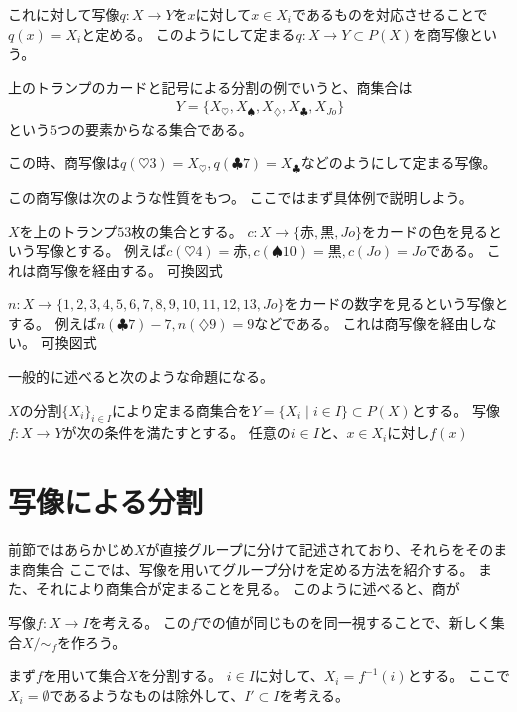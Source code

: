 これに対して写像$q:X\to Y$を$x$に対して$x\in X_i$であるものを対応させることで$q(x)=X_i$と定める。
このようにして定まる$q:X\to Y\subset P(X)$を商写像という。

\begin{eg}
  上のトランプのカードと記号による分割の例でいうと、商集合は
  \begin{align*}
    Y=\{X_\heartsuit,X_\spadesuit,X_\diamondsuit,X_\clubsuit,X_{Jo}\}
  \end{align*}
  という$5$つの要素からなる集合である。

  この時、商写像は$q(\heartsuit3)=X_\heartsuit, q(\clubsuit7)=X_\clubsuit$などのようにして定まる写像。    
\end{eg}

この商写像は次のような性質をもつ。
ここではまず具体例で説明しよう。

\begin{eg}
  $X$を上のトランプ$53$枚の集合とする。
  $c:X\to\{\mbox{赤},\mbox{黒},Jo\}$をカードの色を見るという写像とする。
  例えば$c(\heartsuit4)=\mbox{赤}, c(\spadesuit10)=\mbox{黒}, c(Jo)=Jo$である。
  これは商写像を経由する。
  可換図式

  $n:X\to\{1,2,3,4,5,6,7,8,9,10,11,12,13,Jo\}$をカードの数字を見るという写像とする。
  例えば$n(\clubsuit7)-7, n(\diamondsuit9)=9$などである。
  これは商写像を経由しない。
  可換図式
\end{eg}

一般的に述べると次のような命題になる。
\begin{eg}
  $X$の分割$\{X_i\}_{i\in I}$により定まる商集合を$Y=\{X_i\mid i\in I\}\subset P(X)$とする。
  写像$f:X \to Y$が次の条件を満たすとする。
  任意の$i\in I$と、$x\in X_i$に対し$f(x)$
\end{eg}


\section{写像による分割}

前節ではあらかじめ$X$が直接グループに分けて記述されており、それらをそのまま商集合
ここでは、写像を用いてグループ分けを定める方法を紹介する。
また、それにより商集合が定まることを見る。
このように述べると、商が

写像$f:X \to I$を考える。
この$f$での値が同じものを同一視することで、新しく集合$X/\sim_f$を作ろう。

まず$f$を用いて集合$X$を分割する。
$i\in I$に対して、$X_i=f^{-1}(i)$とする。
ここで$X_i=\emptyset$であるようなものは除外して、$I'\subset I$を考える。

